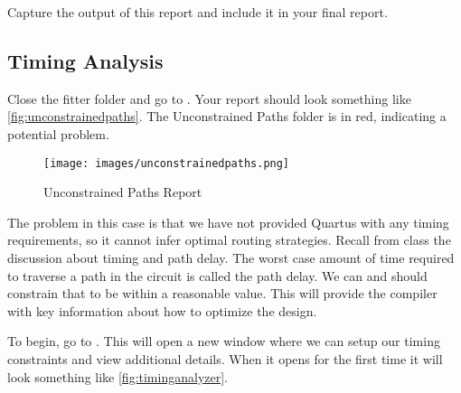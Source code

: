 \documentclass[12pt]{betterjournal}
\begin{document}
\begin{question}
    Capture the output of this report and include it in your final report.
\end{question}

\subsection{Timing Analysis}
Close the fitter folder and go to . Your report should look something like \autoref{fig:unconstrainedpaths}. The Unconstrained Paths folder is in red, indicating a potential problem. 
\begin{figure}
    \centering
    \texttt{[image: images/unconstrainedpaths.png]}
    \caption{Unconstrained Paths Report}
    \label{fig:unconstrainedpaths}
\end{figure}

The problem in this case is that we have not provided Quartus with any timing requirements, so it cannot infer optimal routing strategies. Recall from class the discussion about timing and path delay. The worst case amount of time required to traverse a path in the circuit is called the path delay. We can and should constrain that to be within a reasonable value. This will provide the compiler with key information about how to optimize the design.

To begin, go to . This will open a new window where we can setup our timing constraints and view additional details. When it opens for the first time it will look something like \autoref{fig:timinganalyzer}.
\end{document}
